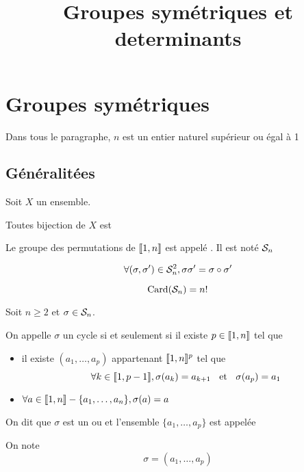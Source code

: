 

\title{Groupes symétriques et determinants}



\section{Groupes symétriques}

Dans tous le paragraphe, $n$ est un entier naturel supérieur ou égal à 1

\subsection{Généralitées}

\begin{dfn}
  Soit $X$ un ensemble.

  Toutes bijection de $X$ est 
\end{dfn}

\begin{dfn}
  Le groupe des permutations de $\llbracket 1, n \rrbracket$ est appelé
  .
  Il est noté $\mathcal{S}_n$ 
\end{dfn}

\begin{dfn}
  \[
    \forall (\sigma, \sigma') \in \mathcal{S}_n^2, \sigma \sigma' = \sigma \circ \sigma'
  \]
\end{dfn}

\begin{prp}
  \[
    \operatorname{\mathrm{Card}}(\mathcal{S}_n) = n!
  \]
\end{prp}

\begin{dfn}
  Soit $n \geq 2$ et $\sigma \in \mathcal{S}_n$.

  On appelle $\sigma$ un cycle si et seulement si il existe
  $p \in \llbracket 1, n \rrbracket$ tel que
  \begin{itemize}
    \item il existe $(a_1, \ldots, a_p)$ appartenant $\llbracket 1, n \rrbracket^p$ tel que
      \[
        \forall k \in \llbracket 1, p - 1 \rrbracket, \sigma(a_k) = a_{k + 1} \;\;\text{ et }\;\; \sigma(a_p) = a_1
      \]
    \item $\forall a \in \llbracket 1, n \rrbracket - \{ a_1, \ldots, a_n \}, \sigma(a) = a$
  \end{itemize}
  
  On dit que $\sigma$ est un  ou  et
  l'ensemble $\{a_1, \ldots, a_p \}$ est appelée 

  On note
  \[
    \sigma = (a_1, \ldots, a_p)
  \]
\end{dfn}

